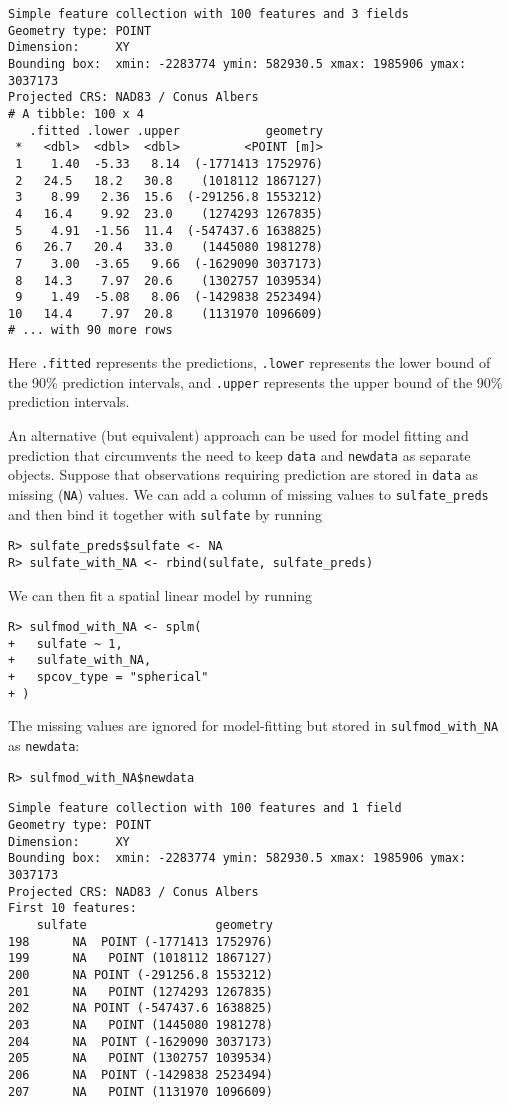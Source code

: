 \documentclass[10pt,letterpaper]{article}
\begin{document}
\begin{verbatim}
Simple feature collection with 100 features and 3 fields
Geometry type: POINT
Dimension:     XY
Bounding box:  xmin: -2283774 ymin: 582930.5 xmax: 1985906 ymax: 3037173
Projected CRS: NAD83 / Conus Albers
# A tibble: 100 x 4
   .fitted .lower .upper            geometry
 *   <dbl>  <dbl>  <dbl>         <POINT [m]>
 1    1.40  -5.33   8.14  (-1771413 1752976)
 2   24.5   18.2   30.8    (1018112 1867127)
 3    8.99   2.36  15.6  (-291256.8 1553212)
 4   16.4    9.92  23.0    (1274293 1267835)
 5    4.91  -1.56  11.4  (-547437.6 1638825)
 6   26.7   20.4   33.0    (1445080 1981278)
 7    3.00  -3.65   9.66  (-1629090 3037173)
 8   14.3    7.97  20.6    (1302757 1039534)
 9    1.49  -5.08   8.06  (-1429838 2523494)
10   14.4    7.97  20.8    (1131970 1096609)
# ... with 90 more rows
\end{verbatim}

\noindent Here \texttt{.fitted} represents the predictions,
\texttt{.lower} represents the lower bound of the 90\% prediction
intervals, and \texttt{.upper} represents the upper bound of the 90\%
prediction intervals.

An alternative (but equivalent) approach can be used for model fitting
and prediction that circumvents the need to keep \texttt{data} and
\texttt{newdata} as separate objects. Suppose that observations
requiring prediction are stored in \texttt{data} as missing
(\texttt{NA}) values. We can add a column of missing values to
\texttt{sulfate\_preds} and then bind it together with \texttt{sulfate}
by running

\begin{verbatim}
R> sulfate_preds$sulfate <- NA
R> sulfate_with_NA <- rbind(sulfate, sulfate_preds)
\end{verbatim}

\noindent We can then fit a spatial linear model by running

\begin{verbatim}
R> sulfmod_with_NA <- splm(
+   sulfate ~ 1,
+   sulfate_with_NA,
+   spcov_type = "spherical"
+ )
\end{verbatim}

\noindent The missing values are ignored for model-fitting but stored in
\texttt{sulfmod\_with\_NA} as \texttt{newdata}:

\begin{verbatim}
R> sulfmod_with_NA$newdata
\end{verbatim}

\begin{verbatim}
Simple feature collection with 100 features and 1 field
Geometry type: POINT
Dimension:     XY
Bounding box:  xmin: -2283774 ymin: 582930.5 xmax: 1985906 ymax: 3037173
Projected CRS: NAD83 / Conus Albers
First 10 features:
    sulfate                  geometry
198      NA  POINT (-1771413 1752976)
199      NA   POINT (1018112 1867127)
200      NA POINT (-291256.8 1553212)
201      NA   POINT (1274293 1267835)
202      NA POINT (-547437.6 1638825)
203      NA   POINT (1445080 1981278)
204      NA  POINT (-1629090 3037173)
205      NA   POINT (1302757 1039534)
206      NA  POINT (-1429838 2523494)
207      NA   POINT (1131970 1096609)
\end{verbatim}
\end{document}
